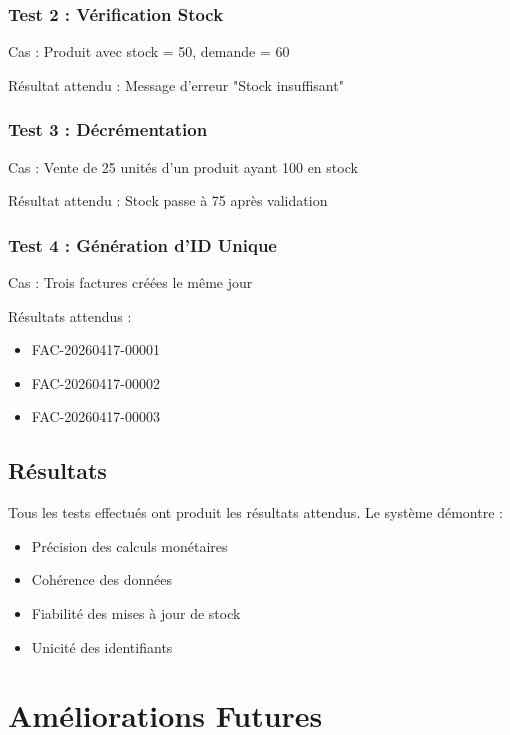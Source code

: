\documentclass[12pt,a4paper]{report}
\begin{document}
\subsection{Test 2 : Vérification Stock}

Cas : Produit avec stock = 50, demande = 60

Résultat attendu : Message d'erreur "Stock insuffisant"

\subsection{Test 3 : Décrémentation}

Cas : Vente de 25 unités d'un produit ayant 100 en stock

Résultat attendu : Stock passe à 75 après validation

\subsection{Test 4 : Génération d'ID Unique}

Cas : Trois factures créées le même jour

Résultats attendus :
\begin{itemize}
    \item FAC-20260417-00001
    \item FAC-20260417-00002
    \item FAC-20260417-00003
\end{itemize}

\section{Résultats}

Tous les tests effectués ont produit les résultats attendus. Le système démontre :
\begin{itemize}
    \item Précision des calculs monétaires
    \item Cohérence des données
    \item Fiabilité des mises à jour de stock
    \item Unicité des identifiants
\end{itemize}

\pagebreak

\chapter{Améliorations Futures}
\end{document}
